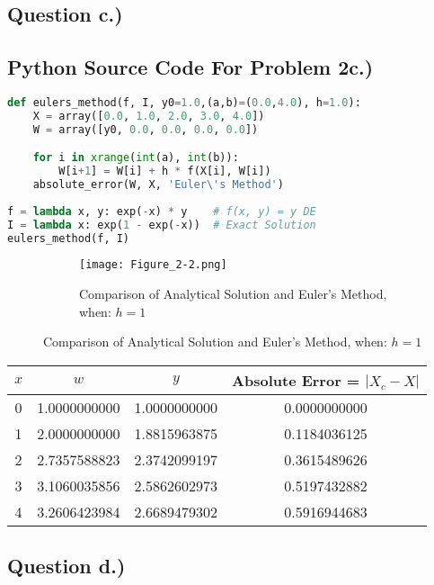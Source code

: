 \documentclass{article}
\begin{document}
\subsection*{Question c.)}
\subsection*{Python Source Code For Problem 2c.)}
\begin{lstlisting}[language=Python]
def eulers_method(f, I, y0=1.0,(a,b)=(0.0,4.0), h=1.0):
    X = array([0.0, 1.0, 2.0, 3.0, 4.0])
    W = array([y0, 0.0, 0.0, 0.0, 0.0])

    for i in xrange(int(a), int(b)):
        W[i+1] = W[i] + h * f(X[i], W[i])
    absolute_error(W, X, 'Euler\'s Method')
    
f = lambda x, y: exp(-x) * y    # f(x, y) = y DE
I = lambda x: exp(1 - exp(-x))  # Exact Solution
eulers_method(f, I)
\end{lstlisting}

\begin{figure}[h!]
  \centering
  \begin{subfigure}{\linewidth}
    \texttt{[image: Figure\_2-2.png]}
    \caption{Comparison of Analytical Solution and Euler's Method, when: $h = 1$}
  \end{subfigure}
\end{figure}

 \begin{center}
\begin{tabular}{ |c|c|c|c| } 
 \hline \hline
    $x$    &  $w$           &  $y$ & Absolute Error = $|X_c - X|$ \\ 
 \hline \hline       
    0      & 1.0000000000 & 1.0000000000 & 0.0000000000\\
 \hline
    1      & 2.0000000000 &   1.8815963875  &   0.1184036125\\
 \hline
    2      & 2.7357588823 &   2.3742099197  &   0.3615489626\\
 \hline
    3      & 3.1060035856 &   2.5862602973  &   0.5197432882\\
 \hline
    4      & 3.2606423984 &   2.6689479302  &    0.5916944683\\
 \hline
\end{tabular}
\end{center}
\pagebreak

\subsection*{Question d.)}
\end{document}
